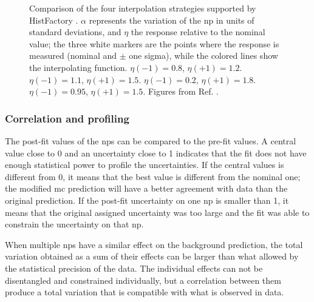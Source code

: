 \begin{figure}[hbt]
\caption{Comparison of the four interpolation strategies supported by HistFactory \cite{Cranmer:1456844}. 
$\alpha$ represents the variation of the \gls{np} in units of standard deviations, and $\eta$ the response relative to the nominal value; 
the three white markers are the points where the response is measured (nominal and $\pm$ one sigma), 
while the colored lines show the interpolating function.
 $\eta(-1) = 0.8$, $\eta(+1) = 1.2$.
 $\eta(-1) = 1.1$, $\eta(+1) = 1.5$.
 $\eta(-1) = 0.2$, $\eta(+1) = 1.8$.
 $\eta(-1) = 0.95$, $\eta(+1) = 1.5$.
Figures from Ref. \cite{Cranmer:1456844}.
}
\label{fig:stat:interp}
\end{figure}


\subsubsection*{Correlation and profiling}

The post-fit values of the \glspl{np} can be compared to the pre-fit values. A central value close to 0 and an uncertainty close to 1 indicates that the fit does not have enough statistical power to profile the uncertainties. If the central values is different from 0, it means that the best value is different from the nominal one; the modified \gls{mc} prediction will have a better agreement with data than the original prediction. If the post-fit uncertainty on one \gls{np} is smaller than 1, it means that the original assigned uncertainty was too large and the fit was able to constrain the uncertainty on that \gls{np}.

When multiple \glspl{np} have a similar effect on the background prediction, the total variation obtained as a sum of their effects can be larger than what allowed by the statistical precision of the data. The individual effects can not be disentangled and constrained individually, but a correlation between them produce a total variation that is compatible with what is observed in data. %



